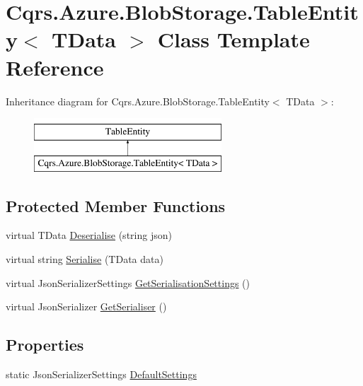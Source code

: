 \hypertarget{classCqrs_1_1Azure_1_1BlobStorage_1_1TableEntity}{}\section{Cqrs.\+Azure.\+Blob\+Storage.\+Table\+Entity$<$ T\+Data $>$ Class Template Reference}
\label{classCqrs_1_1Azure_1_1BlobStorage_1_1TableEntity}
Inheritance diagram for Cqrs.\+Azure.\+Blob\+Storage.\+Table\+Entity$<$ T\+Data $>$\+:\begin{figure}[H]
\begin{center}
\leavevmode
\includegraphics[height=2.000000cm]{classCqrs_1_1Azure_1_1BlobStorage_1_1TableEntity}
\end{center}
\end{figure}
\subsection*{Protected Member Functions}
\begin{DoxyCompactItemize}
\item 
virtual T\+Data \hyperlink{classCqrs_1_1Azure_1_1BlobStorage_1_1TableEntity_a5a5b53a3a2427a368f2ebe404f04f4ff}{Deserialise} (string json)
\item 
virtual string \hyperlink{classCqrs_1_1Azure_1_1BlobStorage_1_1TableEntity_af7467b1194756dd32029dc40f690c4ad}{Serialise} (T\+Data data)
\item 
virtual Json\+Serializer\+Settings \hyperlink{classCqrs_1_1Azure_1_1BlobStorage_1_1TableEntity_aa36736f412df5a1667d7b0e5c0bd3035}{Get\+Serialisation\+Settings} ()
\item 
virtual Json\+Serializer \hyperlink{classCqrs_1_1Azure_1_1BlobStorage_1_1TableEntity_a18d1b7ecf408a921cd0e2e6a8d0f6c74}{Get\+Serialiser} ()
\end{DoxyCompactItemize}
\subsection*{Properties}
\begin{DoxyCompactItemize}
\item 
static Json\+Serializer\+Settings \hyperlink{classCqrs_1_1Azure_1_1BlobStorage_1_1TableEntity_ab7a9041c7d8e5237cfb81ad98b6b3980}{Default\+Settings}
\end{DoxyCompactItemize}


